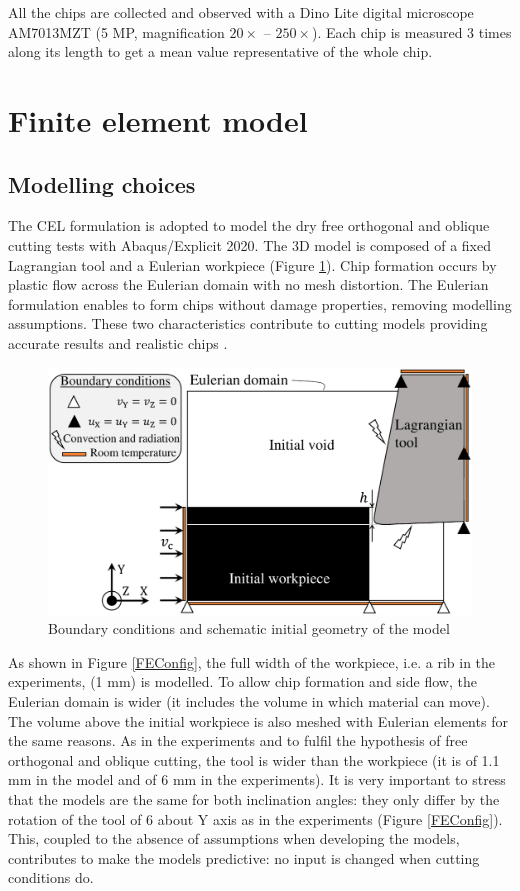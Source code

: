 \documentclass[preprint,12pt,times]{elsarticle}
\begin{document}
All the chips are collected and observed with a Dino Lite digital microscope AM7013MZT (5 MP, magnification $20\times$ -- $250\times$). Each chip is measured 3 times along its length to get a mean value representative of the whole chip.


\section{Finite element model}
\label{FEM}

\subsection{Modelling choices}

The CEL formulation is adopted to model the dry free orthogonal and oblique cutting tests with Abaqus/Explicit 2020. The 3D model is composed of a fixed Lagrangian tool and a Eulerian workpiece (Figure \ref{BC}). Chip formation occurs by plastic flow across the Eulerian domain with no mesh distortion. The Eulerian formulation enables to form chips without damage properties, removing modelling assumptions. These two characteristics contribute to cutting models providing accurate results and realistic chips \cite{ducobu_Application_2016}.

\begin{figure}[!h]
\centering
\includegraphics[width = 140 mm]{Figures/BC} %
\caption{Boundary conditions and schematic initial geometry of the model}
\label{BC}
\end{figure}

As shown in Figure \ref{FEConfig}, the full width of the workpiece, i.e. a rib in the experiments, (1 mm) is modelled. To allow chip formation and side flow, the Eulerian domain is wider (it includes the volume in which material can move). The volume above the initial workpiece is also meshed with Eulerian elements for the same reasons. As in the experiments and to fulfil the hypothesis of free orthogonal and oblique cutting, the tool is wider than the workpiece (it is of 1.1 mm in the model and of 6 mm in the experiments). It is very important to stress that the models are the same for both inclination angles: they only differ by the rotation of the tool of 6\textdegree{} about Y axis as in the experiments (Figure \ref{FEConfig}). This, coupled to the absence of assumptions when developing the models, contributes to make the models predictive: no input is changed when cutting conditions do.
\end{document}
